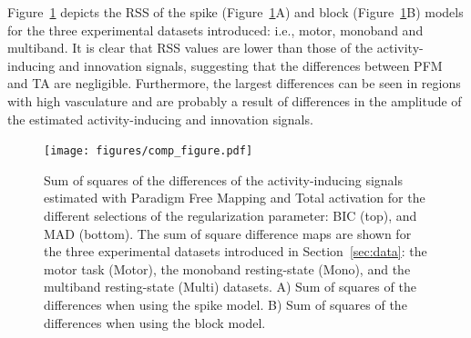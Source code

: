 Figure~\ref{fig:rss} depicts the RSS of the spike (Figure~\ref{fig:rss}A) and block (Figure~\ref{fig:rss}B) models for the three experimental datasets introduced: i.e., motor, monoband and multiband. It is clear that RSS values are lower than those of the activity-inducing and innovation signals, suggesting that the differences between PFM and TA are negligible. Furthermore, the largest differences can be seen in regions with high vasculature and are probably a result of differences in the amplitude of the estimated activity-inducing and innovation signals. 


\begin{figure}[t!]
    \begin{center}
        \texttt{[image: figures/comp\_figure.pdf]}
    \end{center}
    \caption{Sum of squares of the differences of the activity-inducing signals estimated with Paradigm Free Mapping and Total activation for the different selections of the regularization parameter: BIC (top), and MAD (bottom). The sum of square difference maps are shown for the three experimental datasets introduced in Section~\ref{sec:data}: the motor task (Motor), the monoband resting-state (Mono), and the multiband resting-state (Multi) datasets. A) Sum of squares of the differences when using the spike model. B) Sum of squares of the differences when using the block model.}
\label{fig:rss}
\end{figure}


